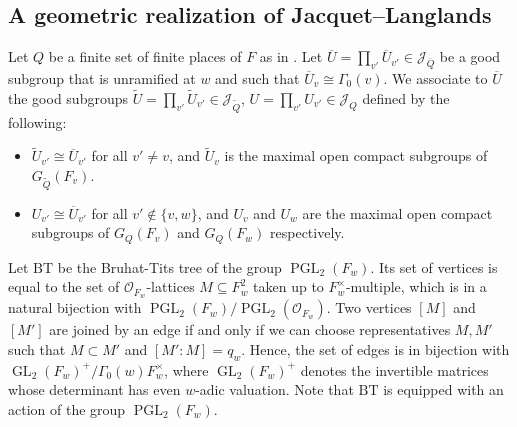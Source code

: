 \documentclass[a4paper, notitlepage, 10pt]{amsart}
\theoremstyle{plain} %
\theoremstyle{definition} %
\theoremstyle{remark} %
\numberwithin{equation}{section}
\newcommand{\GL}{\operatorname{GL}} %
\newcommand{\PGL}{\operatorname{PGL}} %
\begin{document}
\subsection{A geometric realization of Jacquet--Langlands}\label{chargrpofshimuracurve}
Let $Q$ be a finite set of finite places of $F$ as in . Let  $\overline{U}=\prod_{v'} \overline{U}_{v'}\in \mathcal{J}_{\overline{Q}}$ be a good subgroup that is unramified at $w$ and such that $\overline{U}_v\cong \Gamma_0(v)$. We associate to $\overline{U}$ the good subgroups $\widetilde{U}=\prod_{v'} \widetilde{U}_{v'}\in \mathcal{J}_{\widetilde{Q}}$, $U=\prod_{v'} U_{v'}\in \mathcal{J}_{Q}$ defined by the following: 
\begin{itemize}
    \item $\widetilde{U}_{v'}\cong \overline{U}_{v'}$ for all $v'\neq v$, and $\widetilde{U}_{v}$ is the maximal open compact subgroups of $G_{\widetilde{Q}}(F_{v})$.
    \item $U_{v'}\cong \overline{U}_{v'}$ for all $v'\not\in \{v,w\}$, and  $U_{v}$ and $U_{w}$ are the maximal open compact subgroups of $G_Q(F_{v})$ and $G_Q(F_w)$ respectively.
\end{itemize}

Let $\text{BT}$ be the Bruhat-Tits tree of the group $\PGL_2(F_{w})$. Its set of vertices is equal to the set of $\mathcal{O}_{F_{w}}$-lattices $M\subseteq F_{w}^2$ taken up to $F_{w}^\times$-multiple, which is in a natural bijection with $\PGL_2(F_{w})/\PGL_2(\mathcal{O}_{F_{w}})$. Two vertices $[M]$ and $[M']$ are joined by an edge if and only if we can choose representatives $M,M'$ such that $M\subset M'$ and $[M':M]=q_{w}$. Hence, the set of edges is in bijection with $\GL_2(F_{w})^+/\Gamma_0(w)F_{w}^\times$, where $ \GL_2(F_{w})^+$ denotes the invertible matrices whose determinant has even $w$-adic valuation. Note that $\text{BT} $ is equipped with an action of the group $\PGL_2(F_{w})$. 
\end{document}
